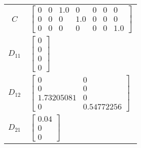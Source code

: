 \begin{tabular}{cl}
   $C$    & $\left[\begin{matrix}0 & 0 & 1.0 & 0 & 0 & 0 & 0\\0 & 0 & 0 & 1.0 & 0 & 0 & 0\\0 & 0 & 0 & 0 & 0 & 0 & 1.0\end{matrix}\right]$                                                                                                                                                         \\
 $D_{11}$ & $\left[\begin{matrix}0\\0\\0\\0\end{matrix}\right]$                                                                                                                                                                                                                                    \\
 $D_{12}$ & $\left[\begin{matrix}0 & 0\\0 & 0\\1.73205081 & 0\\0 & 0.54772256\end{matrix}\right]$                                                                                                                                                                                                  \\
 $D_{21}$ & $\left[\begin{matrix}0.04\\0\\0\end{matrix}\right]$                                                                                                                                                                                                                                    \\
\hline
\end{tabular}